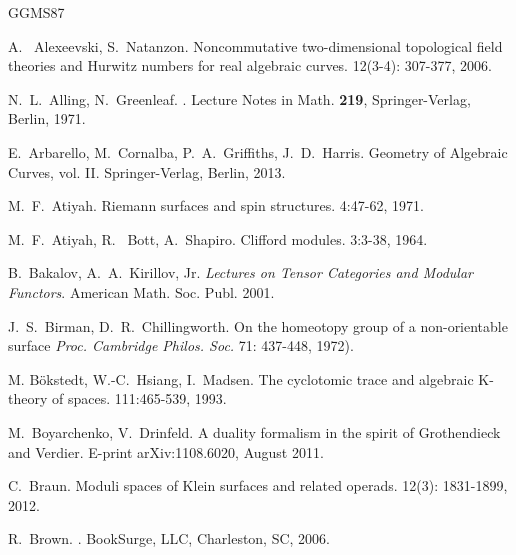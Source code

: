 \documentclass[english,11pt,leqno]{article}
\theoremstyle{definition}
\theoremstyle{remark}
\numberwithin{equation}{section}
\begin{document}
 \vfill\eject
 
 \begin{thebibliography}{GGMS87}
 
 \def\nb{\newblock}
 
 
 
 
 A.~ Alexeevski, S.~Natanzon.
 \newblock  Noncommutative two-dimensional topological field theories and Hurwitz 
 numbers for real algebraic curves. 
 12(3-4): 307-377, 2006. 
 
 N.~L.~Alling, N.~Greenleaf.
 .
 \newblock Lecture Notes in Math. {\bf 219},
 Springer-Verlag, Berlin, 1971. 
 
  E.~Arbarello, M.~Cornalba,
 P.~A.~Griffiths, J.~D.~Harris.
 \nb
 {Geometry of Algebraic Curves, vol. II}.
 \nb Springer-Verlag, Berlin, 2013. 
 
 
  M.~F.~Atiyah.
 \newblock Riemann surfaces and spin structures.
  4:47-62, 1971. 
 
  
  M.~F.~Atiyah, R.~ Bott, A.~Shapiro.
 \newblock Clifford modules.
  3:3-38, 1964. 
 
  B.~Bakalov, A.~A.~Kirillov, Jr. 
 \newblock 
 {\em Lectures on Tensor Categories and Modular Functors}.
 \newblock American Math.  Soc. Publ.  2001. 
 
 
 J.~S.~Birman, D.~R.~Chillingworth.
\newblock
On the homeotopy group of a non-orientable surface
\newblock
{\em Proc. Cambridge Philos. Soc.} 71: 437-448, 1972). 
 
    
 M. B\"okstedt, W.-C.~Hsiang, I.~Madsen.
 \newblock The cyclotomic trace and algebraic K-theory of
 spaces. 
  111:465-539, 1993. 
 
  M.~Boyarchenko, V.~Drinfeld. 
  \newblock 
  A duality formalism in the spirit of Grothendieck and Verdier.
  \newblock 
 E-print
 arXiv:1108.6020, August 2011. 
 
 C.~Braun.
 \newblock
  Moduli spaces of Klein surfaces and related operads. 
   12(3):  1831-1899, 2012. 
  
R.~Brown.
.
\newblock BookSurge, LLC, Charleston, SC, 2006.
  

\end{thebibliography}
\end{document}
